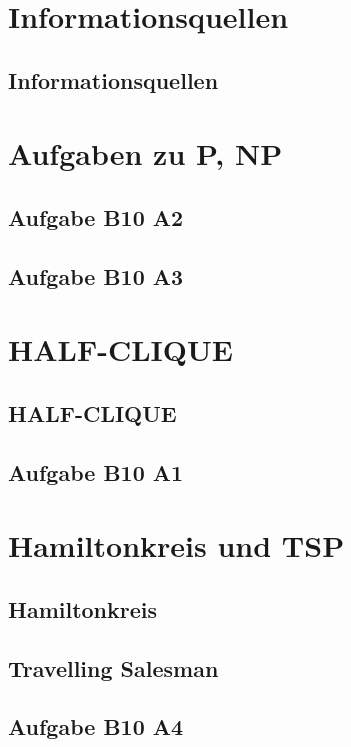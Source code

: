 




\section{Informationsquellen}
\subsection{Informationsquellen}

\section{Aufgaben zu P, NP}
\subsection{Aufgabe B10 A2}
\subsection{Aufgabe B10 A3}

\section{HALF-CLIQUE}
\subsection{HALF-CLIQUE}
\subsection{Aufgabe B10 A1}

\section{Hamiltonkreis und TSP}
\subsection{Hamiltonkreis}
\subsection{Travelling Salesman}
\subsection{Aufgabe B10 A4}


